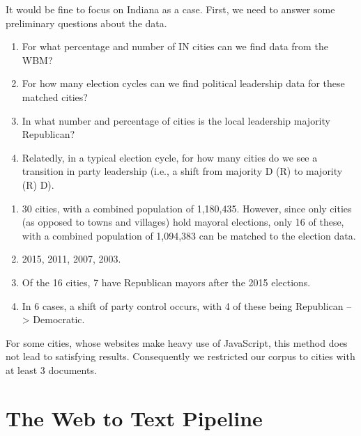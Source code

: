 \documentclass[11pt]{article}
\begin{document}
It would be fine to focus on Indiana as a case. First, we need to answer some preliminary questions about the data.

\begin{enumerate}

\item For what percentage and number of IN cities can we find data from the WBM?
\item For how many election cycles can we find political leadership data for these matched cities?
\item In what number and percentage of cities is the local leadership majority Republican? 
\item Relatedly, in a typical election cycle, for how many cities do we see a transition in party leadership (i.e., a shift from majority D (R) to majority (R) D). 

\end{enumerate}

\begin{enumerate}
	
	\item 30 cities, with a combined population of 1,180,435. However, since only cities (as opposed to towns and villages) hold mayoral elections, only 16 of these, with a combined population of 1,094,383 can be matched to the election data.
	\item 2015, 2011, 2007, 2003.
	\item Of the 16 cities, 7 have Republican mayors after the 2015 elections.
	\item In 6 cases, a shift of party control occurs, with 4 of these being Republican --> Democratic. 
	
\end{enumerate}





\begin{landscape}

\end{landscape}

For some cities, whose websites make heavy use of JavaScript, this method does not lead to satisfying results. Consequently we restricted our corpus to cities with at least 3 documents.


\section{The Web to Text Pipeline}
\end{document}
